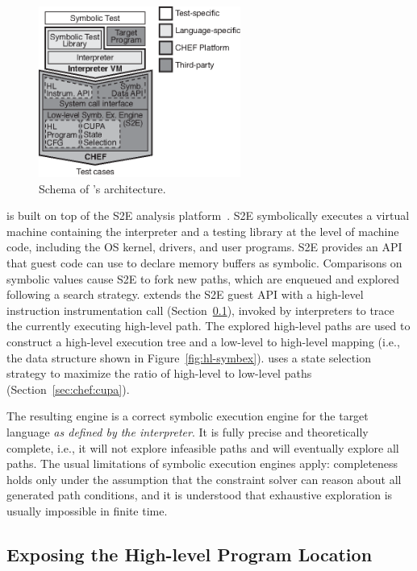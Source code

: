 \begin{figure}
  \centering
  \includegraphics[width=2.6in]{figures/chef/system-arch}
  \caption{Schema of \chef's architecture.}
  \label{fig:system-arch}
\end{figure}

\chef is built on top of the S2E analysis platform~\cite{s2eSystem}. S2E symbolically executes a virtual machine containing the interpreter and a testing library at the level of machine code,  including the OS kernel, drivers, and user programs.  S2E provides an API that guest code can use to declare memory buffers as symbolic. Comparisons on symbolic values cause S2E to fork new paths, which are enqueued and explored following a search strategy.
%
\chef extends the S2E guest API with a high-level instruction instrumentation call (Section~\ref{sec:chef:exposehlpc}), invoked by interpreters to trace the currently executing high-level path.  The explored high-level paths are used to construct a high-level execution tree and a low-level to high-level mapping (i.e., the data structure shown in Figure~\ref{fig:hl-symbex}).  \chef uses a state selection strategy to maximize the ratio of high-level to low-level paths (Section~\ref{sec:chef:cupa}).

The resulting engine is a correct symbolic execution engine for the target language \textit{as defined by the interpreter}. It is fully precise and theoretically complete, i.e., it will not explore infeasible paths and will eventually explore all paths. The usual limitations of symbolic execution engines apply: completeness holds only under the assumption that the constraint solver can reason about all generated path conditions, and it is understood that exhaustive exploration is usually impossible in finite time.


\subsection{Exposing the High-level Program Location}
\label{sec:chef:exposehlpc}

